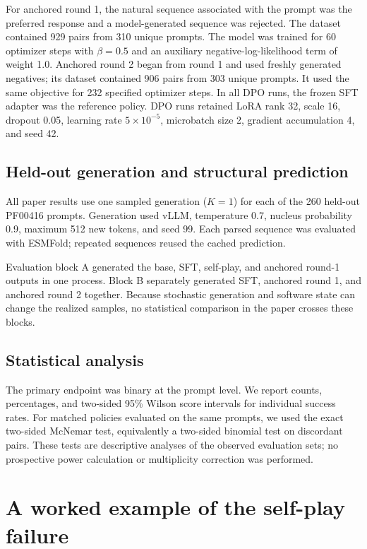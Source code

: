 \documentclass{article}
\begin{document}
For anchored round 1, the natural sequence associated with the prompt was the
preferred response and a model-generated sequence was rejected. The dataset
contained 929 pairs from 310 unique prompts. The model was trained for 60
optimizer steps with $\beta=0.5$ and an auxiliary negative-log-likelihood term
of weight 1.0. Anchored round 2 began from round 1 and used freshly generated
negatives; its dataset contained 906 pairs from 303 unique prompts. It used the
same objective for 232 specified optimizer steps. In all DPO runs, the frozen
SFT adapter was the reference policy. DPO runs retained LoRA rank 32, scale 16,
dropout 0.05, learning rate $5\times10^{-5}$, microbatch size 2, gradient
accumulation 4, and seed 42.

\subsection{Held-out generation and structural prediction}

All paper results use one sampled generation ($K=1$) for each of the 260
held-out PF00416 prompts. Generation used vLLM, temperature 0.7, nucleus
probability 0.9, maximum 512 new tokens, and seed 99. Each parsed sequence was
evaluated with ESMFold; repeated sequences reused the cached prediction.

Evaluation block A generated the base, SFT, self-play, and anchored round-1
outputs in one process. Block B separately generated SFT, anchored round 1, and
anchored round 2 together. Because stochastic generation and software state can
change the realized samples, no statistical comparison in the paper crosses
these blocks.

\subsection{Statistical analysis}

The primary endpoint was binary at the prompt level. We report counts,
percentages, and two-sided 95\% Wilson score intervals for individual success
rates. For matched policies evaluated on the same prompts, we used the exact
two-sided McNemar test, equivalently a two-sided binomial test on discordant
pairs. These tests are descriptive analyses of the observed evaluation sets;
no prospective power calculation or multiplicity correction was performed.

\section{A worked example of the self-play failure}
\label{app:worked}
\end{document}
